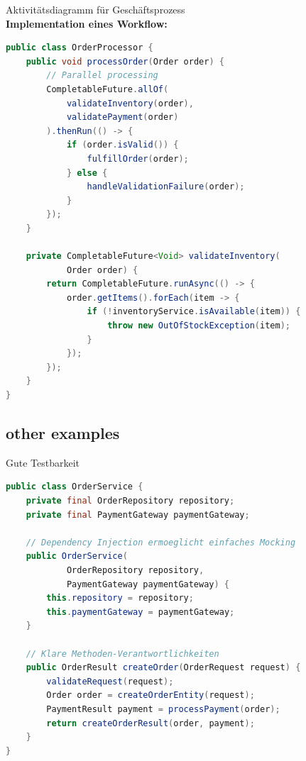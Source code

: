 \begin{example2}{Aktivitätsdiagramm für Geschäftsprozess}\\
\textbf{Implementation eines Workflow:}

\begin{lstlisting}[language=Java, style=basesmol]
public class OrderProcessor {
    public void processOrder(Order order) {
        // Parallel processing
        CompletableFuture.allOf(
            validateInventory(order),
            validatePayment(order)
        ).thenRun(() -> {
            if (order.isValid()) {
                fulfillOrder(order);
            } else {
                handleValidationFailure(order);
            }
        });
    }
    
    private CompletableFuture<Void> validateInventory(
            Order order) {
        return CompletableFuture.runAsync(() -> {
            order.getItems().forEach(item -> {
                if (!inventoryService.isAvailable(item)) {
                    throw new OutOfStockException(item);
                }
            });
        });
    }
}
\end{lstlisting}
\end{example2}

\pagebreak



\subsection{other examples}

\begin{example2}{Gute Testbarkeit}\\

\begin{lstlisting}[language=Java, style=basesmol]
public class OrderService {
    private final OrderRepository repository;
    private final PaymentGateway paymentGateway;
    
    // Dependency Injection ermoeglicht einfaches Mocking
    public OrderService(
            OrderRepository repository,
            PaymentGateway paymentGateway) {
        this.repository = repository;
        this.paymentGateway = paymentGateway;
    }
    
    // Klare Methoden-Verantwortlichkeiten
    public OrderResult createOrder(OrderRequest request) {
        validateRequest(request);
        Order order = createOrderEntity(request);
        PaymentResult payment = processPayment(order);
        return createOrderResult(order, payment);
    }
}
\end{lstlisting}
\end{example2}


